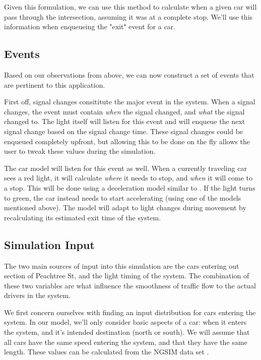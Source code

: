\documentclass[a4paper,12pt]{article}
\begin{document}
Given this formulation, we can use this method to calculate when a given car will pass through the intersection,
assuming it was at a complete stop. We'll use this information when enqueueing the "exit" event for a car.

\subsection{Events}
Based on our observations from above, we can now construct a set of events that are pertinent to this application.

First off, signal changes consititute the major event in the system. When a signal changes, the event must contain
\emph{when} the signal changed, and \emph{what} the signal changed to. The light itself will listen for this event
and will enqueue the next signal change based on the signal change time. These signal changes could be enqueued
completely upfront, but allowing this to be done on the fly allows the user to tweak these values during the simulation.

The car model will listen for this event as well. When a currently traveling car sees a red light, it will calculate
\emph{where} it needs to stop, and \emph{when} it will come to a stop. This will be done using a deceleration model
similar to \cite{deceleration}. If the light turns to green, the car instead needs to start accelerating (using one of
the models mentioned above). The model will adapt to light changes during movement by recalculating its estimated
exit time of the system.

\subsection{Simulation Input}
The two main sources of input into this simulation are the cars entering out section of Peachtree St, and the light
timing of the system. The combination of these two variables are what influence the smoothness
of traffic flow to the actual drivers in the system.

We first concern ourselves with finding an input distribution for cars entering the system. In our model, we'll only
consider basic aspects of a car: when it enters the system, and it's intended destination (north or south). We will assume that all cars have the same speed entering the system, and that they
have the same length. These values can be calculated from the NGSIM data set \cite{ngsim}.
\end{document}
